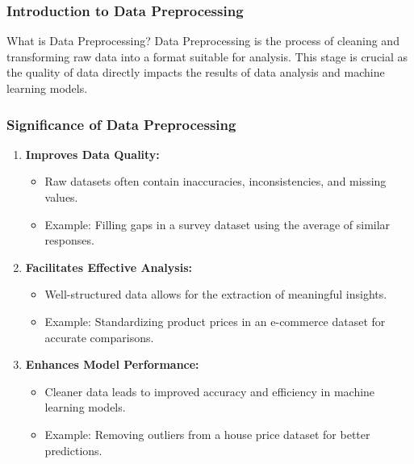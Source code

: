 \documentclass[aspectratio=169]{beamer}
\begin{document}
\frame{\titlepage}

\begin{frame}[fragile]
    \titlepage
\end{frame}

\begin{frame}[fragile]
    \frametitle{Introduction to Data Preprocessing}
    \begin{block}{What is Data Preprocessing?}
        Data Preprocessing is the process of cleaning and transforming raw data into a format suitable for analysis. This stage is crucial as the quality of data directly impacts the results of data analysis and machine learning models.
    \end{block}
\end{frame}

\begin{frame}[fragile]
    \frametitle{Significance of Data Preprocessing}
    \begin{enumerate}
        \item \textbf{Improves Data Quality:}
        \begin{itemize}
            \item Raw datasets often contain inaccuracies, inconsistencies, and missing values.
            \item Example: Filling gaps in a survey dataset using the average of similar responses.
        \end{itemize}
        
        \item \textbf{Facilitates Effective Analysis:}
        \begin{itemize}
            \item Well-structured data allows for the extraction of meaningful insights.
            \item Example: Standardizing product prices in an e-commerce dataset for accurate comparisons.
        \end{itemize}
        
        \item \textbf{Enhances Model Performance:}
        \begin{itemize}
            \item Cleaner data leads to improved accuracy and efficiency in machine learning models.
            \item Example: Removing outliers from a house price dataset for better predictions.
        \end{itemize}
    \end{enumerate}
\end{frame}
\end{document}

